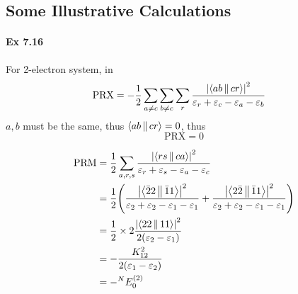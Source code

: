 \documentclass[a4paper]{article}
\newcommand{\ex}[1]{\paragraph{Ex #1}}
\numberwithin{equation}{subsection}
\begin{document}
\subsection{Some Illustrative Calculations}
\ex{7.16}
For 2-electron system, in
\begin{align}
\text{PRX} &= -\dfrac{1}{2}\sum_{a\neq c}\sum_{b\neq c}\sum_r \dfrac{\abs{
		\Braket{ab||cr}
	}^2	}{\varepsilon_r + \varepsilon_c - \varepsilon_a - \varepsilon_b} %
\end{align}
$ a,b $ must be the same, thus $ \Braket{ab||cr} = 0 $, thus
\begin{equation}\label{key}
\text{PRX} = 0
\end{equation}

\begin{align}
\text{PRM} &= \dfrac{1}{2}\sum_{a,r,s} \dfrac{\abs{ \Braket{rs||ca} }^2 }{\varepsilon_r + \varepsilon_s - \varepsilon_a - \varepsilon_c} \notag\\
&= \dfrac{1}{2} \qty(\dfrac{\abs{ \Braket{\bar{2}2||\bar{1}1} }^2 }{\varepsilon_2 + \varepsilon_2 - \varepsilon_1 - \varepsilon_1}
+ \dfrac{\abs{ \Braket{2\bar{2}||\bar{1}1} }^2 }{\varepsilon_2 + \varepsilon_2 - \varepsilon_1 - \varepsilon_1}) \notag\\
&= \dfrac{1}{2} \times 2 \dfrac{\abs{ \Braket{22||11} }^2 }{2(\varepsilon_2 - \varepsilon_1)}
 \notag\\
&= -\dfrac{K_{12}^2 }{2(\varepsilon_1 - \varepsilon_2)} \notag\\
&= -{^N}E_0^{(2)}
\end{align}
\end{document}

